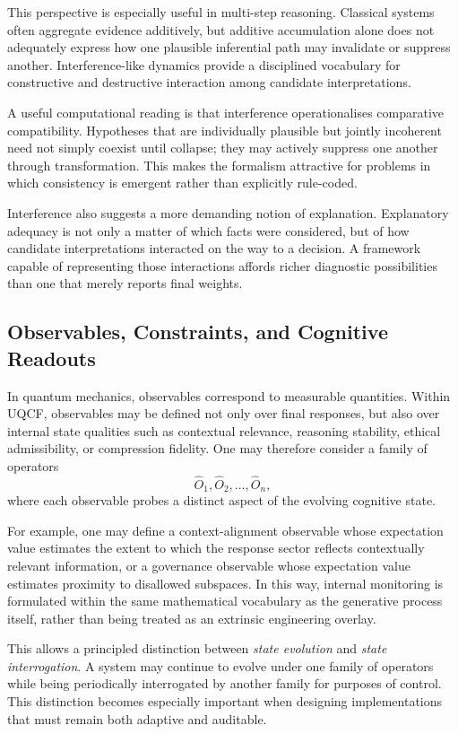 \documentclass[12pt]{article}
\begin{document}
This perspective is especially useful in multi-step reasoning. Classical systems often aggregate evidence additively, but additive accumulation alone does not adequately express how one plausible inferential path may invalidate or suppress another. Interference-like dynamics provide a disciplined vocabulary for constructive and destructive interaction among candidate interpretations.

A useful computational reading is that interference operationalises comparative compatibility. Hypotheses that are individually plausible but jointly incoherent need not simply coexist until collapse; they may actively suppress one another through transformation. This makes the formalism attractive for problems in which consistency is emergent rather than explicitly rule-coded.

Interference also suggests a more demanding notion of explanation. Explanatory adequacy is not only a matter of which facts were considered, but of how candidate interpretations interacted on the way to a decision. A framework capable of representing those interactions affords richer diagnostic possibilities than one that merely reports final weights.

\subsection{Observables, Constraints, and Cognitive Readouts}
In quantum mechanics, observables correspond to measurable quantities. Within UQCF, observables may be defined not only over final responses, but also over internal state qualities such as contextual relevance, reasoning stability, ethical admissibility, or compression fidelity. One may therefore consider a family of operators
\begin{equation}
\hat{O}_1, \hat{O}_2, \dots, \hat{O}_n,
\end{equation}
where each observable probes a distinct aspect of the evolving cognitive state.

For example, one may define a context-alignment observable whose expectation value estimates the extent to which the response sector reflects contextually relevant information, or a governance observable whose expectation value estimates proximity to disallowed subspaces. In this way, internal monitoring is formulated within the same mathematical vocabulary as the generative process itself, rather than being treated as an extrinsic engineering overlay.

This allows a principled distinction between \emph{state evolution} and \emph{state interrogation}. A system may continue to evolve under one family of operators while being periodically interrogated by another family for purposes of control. This distinction becomes especially important when designing implementations that must remain both adaptive and auditable.
\end{document}
